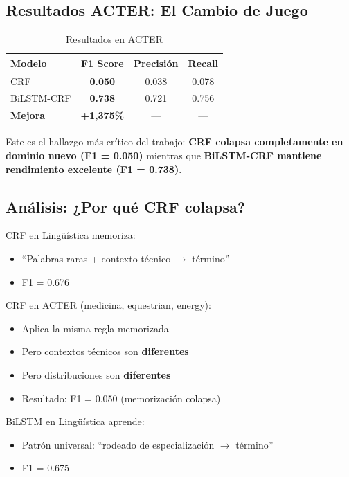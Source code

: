 \subsection{Resultados ACTER: El Cambio de Juego}

\begin{table}[H]
\centering
\caption{Resultados en ACTER}
\label{tab:acter_results}
\begin{tabular}{lccc}
\toprule
\textbf{Modelo} & \textbf{F1 Score} & \textbf{Precisión} & \textbf{Recall} \\
\midrule
CRF & \textbf{0.050} & 0.038 & 0.078 \\
BiLSTM-CRF & \textbf{0.738} & 0.721 & 0.756 \\
\midrule
\textbf{Mejora} & \textbf{+1,375\%} & --- & --- \\
\bottomrule
\end{tabular}
\end{table}

Este es el hallazgo más crítico del trabajo: \textbf{CRF colapsa completamente en dominio nuevo (F1 = 0.050)} mientras que \textbf{BiLSTM-CRF mantiene rendimiento excelente (F1 = 0.738)}.

\subsection{Análisis: ¿Por qué CRF colapsa?}

CRF en Lingüística memoriza:
\begin{itemize}
    \item ``Palabras raras + contexto técnico $\rightarrow$ término''
    \item F1 = 0.676
\end{itemize}

CRF en ACTER (medicina, equestrian, energy):
\begin{itemize}
    \item Aplica la misma regla memorizada
    \item Pero contextos técnicos son \textbf{diferentes}
    \item Pero distribuciones son \textbf{diferentes}
    \item Resultado: F1 = 0.050 (memorización colapsa)
\end{itemize}

BiLSTM en Lingüística aprende:
\begin{itemize}
    \item Patrón universal: ``rodeado de especialización $\rightarrow$ término''
    \item F1 = 0.675
\end{itemize}

